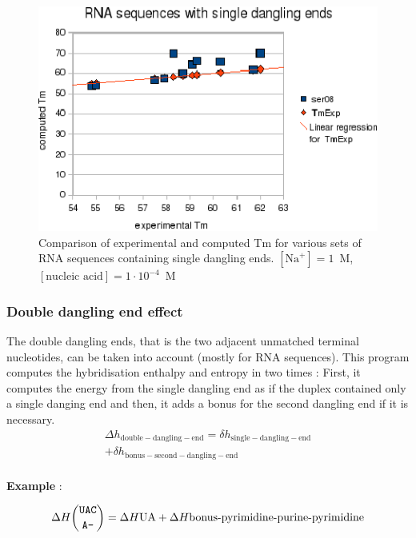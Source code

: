 \documentclass{article}
\begin{document}
\begin{figure}[h]
\includegraphics[width=1\linewidth]{images/RNASingleDanglingEnd}
\caption{Comparison of experimental and computed Tm for various sets of
 RNA sequences containing single dangling ends. $[\mbox{Na}^+] = 1$~M, $[\mbox{nucleic acid}] = 1\cdot{}10^{-4}$~M}
\end{figure}

\clearpage
\subsubsection{Double dangling end effect}

The double dangling ends, that is the two adjacent unmatched terminal nucleotides, can be taken into
account (mostly for RNA sequences). This program computes the hybridisation enthalpy and entropy in two times :
First, it computes the energy from the single dangling end as if the duplex contained
only a single danging end and then, it adds a bonus for the second dangling end if it is necessary. 
\begin{multline*}
\Delta{}h_\mathrm{double-dangling-end} =
\delta{}h_\mathrm{single-dangling-end} \\ + 
\delta{}h_\mathrm{bonus-second-dangling-end}\\
\end{multline*}

\textbf{Example} :

\begin{multline*}
\Delta H {\mbox{\texttt{UAC}} \choose \mbox{\texttt{A--}}} =
\Delta H {\mbox{UA}} +
\Delta H {\mbox{bonus-pyrimidine-purine-pyrimidine}} \\
\end{multline*}
\end{document}
